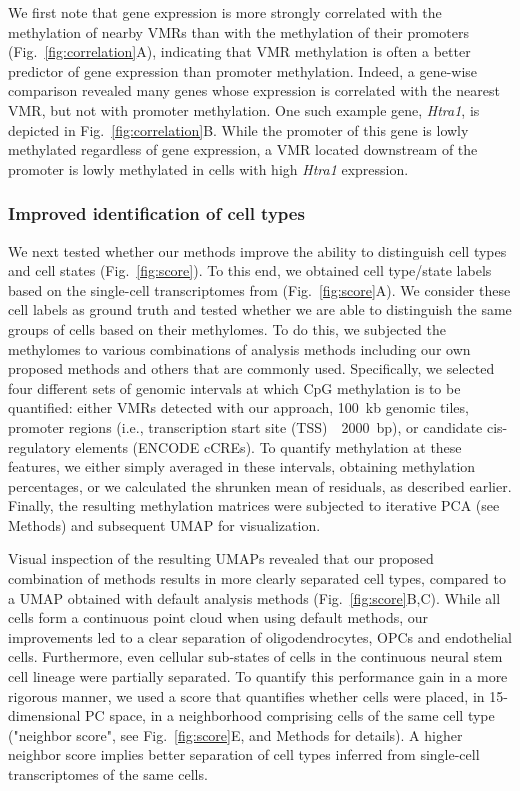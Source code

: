 \documentclass[10pt]{article}
\begin{document}
We first note that gene expression is more strongly correlated with the methylation of nearby VMRs than with the methylation of their promoters (Fig.~\ref{fig:correlation}A), indicating that VMR methylation is often a better predictor of gene expression than promoter methylation.
Indeed, a gene-wise comparison revealed many genes whose expression is correlated with the nearest VMR, but not with promoter methylation.
One such example gene, \textit{Htra1}, is depicted in Fig.~\ref{fig:correlation}B.
While the promoter of this gene is lowly methylated regardless of gene expression, a VMR located downstream of the promoter is lowly methylated in cells with high \textit{Htra1} expression.

\subsubsection*{Improved identification of cell types}

We next tested whether our methods improve the ability to distinguish cell types and cell states (Fig.~\ref{fig:score}).
To this end, we obtained cell type/state labels based on the single-cell transcriptomes from \citet{kremer_scnmt} (Fig.~\ref{fig:score}A).
We consider these cell labels as ground truth and tested whether we are able to distinguish the same groups of cells based on their methylomes.
To do this, we subjected the methylomes to various combinations of analysis methods including our own proposed methods and others that are commonly used.
Specifically, we selected four different sets of genomic intervals at which CpG methylation is to be quantified:
either VMRs detected with our approach, 100~kb genomic tiles, promoter regions (i.e., transcription start site (TSS)~\textpm~2000~bp), or candidate cis-regulatory elements (ENCODE cCREs\citep{encode2020expanded}).
To quantify methylation at these features, we either simply averaged in these intervals, obtaining methylation percentages, or we calculated the shrunken mean of residuals, as described earlier.
Finally, the resulting methylation matrices were subjected to iterative PCA (see Methods) and subsequent UMAP for visualization.


Visual inspection of the resulting UMAPs revealed that our proposed combination of methods results in more clearly separated cell types, compared to a UMAP obtained with default analysis methods (Fig.~\ref{fig:score}B,C).
While all cells form a continuous point cloud when using default methods, our improvements led to a clear separation of oligodendrocytes, OPCs and endothelial cells.
Furthermore, even cellular sub-states of cells in the continuous neural stem cell lineage were partially separated.
To quantify this performance gain in a more rigorous manner, we used a score that quantifies whether cells were placed, in 15-dimensional PC space, in a neighborhood comprising cells of the same cell type ("neighbor score", see Fig.~\ref{fig:score}E, and Methods for details).
A higher neighbor score implies better separation of cell types inferred from single-cell transcriptomes of the same cells.
\end{document}
